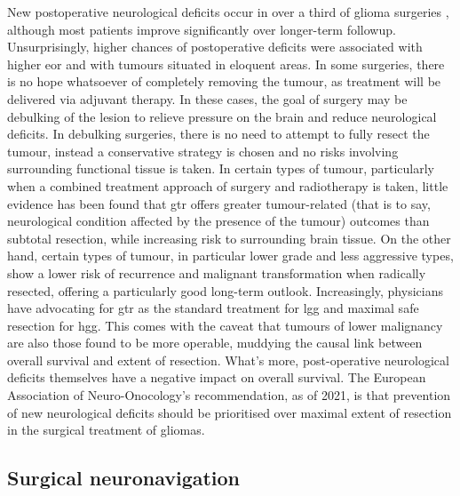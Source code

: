 New postoperative neurological deficits occur in over a third of glioma surgeries \autocite{Zetterling2020a}, although most patients improve significantly over longer-term followup.
Unsurprisingly, higher chances of postoperative deficits were associated with higher \gls{eor} and with tumours situated in eloquent areas.\autocite{Zetterling2020a}
In some surgeries, there is no hope whatsoever of completely removing the tumour, as treatment will be delivered via adjuvant therapy.
In these cases, the goal of surgery may be debulking of the lesion to relieve pressure on the brain and reduce neurological deficits.
In debulking surgeries, there is no need to attempt to fully resect the tumour, instead a conservative strategy is chosen and no risks involving surrounding functional tissue is taken.
In certain types of tumour, particularly when a combined treatment approach of surgery and radiotherapy is taken, little evidence has been found that \gls{gtr} offers greater tumour-related (that is to say, neurological condition affected by the presence of the tumour) outcomes than subtotal resection, while increasing risk to surrounding brain tissue.
On the other hand, certain types of tumour, in particular lower grade and less aggressive types, show a lower risk of recurrence and malignant transformation when radically resected, offering a particularly good long-term outlook.
Increasingly, physicians have advocating for \gls{gtr} as the standard treatment for \gls{lgg} and maximal safe resection for \gls{hgg}. \autocite{Rincon-Torroella2019}
This comes with the caveat that tumours of lower malignancy are also those found to be more operable, muddying the causal link between overall survival and extent of resection.\autocite{Weller2021}
What's more, post-operative neurological deficits themselves have a negative impact on overall survival.
The European Association of Neuro-Onocology's recommendation, as of 2021, is that prevention of new neurological deficits should be prioritised over maximal extent of resection in the surgical treatment of gliomas.\autocite{Weller2021}


\subsection{Surgical neuronavigation}


